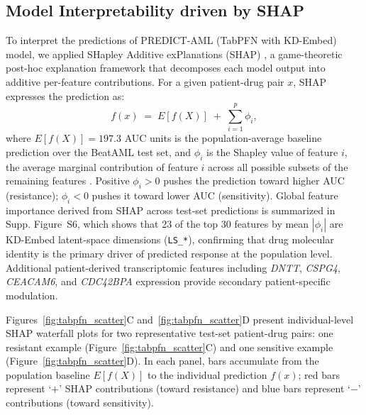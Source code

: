 \documentclass[pdflatex,sn-mathphys-num]{sn-jnl}
\theoremstyle{thmstyleone}
\theoremstyle{thmstyletwo}
\theoremstyle{thmstylethree}
\begin{document}
\subsection{Model Interpretability driven by SHAP}\label{sec3.3}
To interpret the predictions of PREDICT-AML (TabPFN with KD-Embed) model, we applied SHapley Additive exPlanations (SHAP) \cite{lundberg2017unified}, a game-theoretic post-hoc explanation framework that decomposes each model output into additive per-feature contributions. For a given patient-drug pair $x$, SHAP expresses the prediction as:
\begin{equation}
    f(x) \;=\; E[f(X)] \;+\; \sum_{i=1}^{p} \phi_i,
    \label{eq:shap}
\end{equation}
where $E[f(X)] = 197.3$ AUC units is the population-average baseline prediction over the BeatAML test set, and $\phi_i$ is the Shapley value of feature $i$, the average marginal contribution of feature $i$ across all possible subsets of the remaining features \cite{shapley1953stochastic}. Positive $\phi_i > 0$ pushes the prediction toward higher AUC (resistance); $\phi_i < 0$ pushes it toward lower AUC (sensitivity). Global feature importance derived from SHAP across test-set predictions is summarized in Supp. Figure~S6, which shows that 23 of the top 30 features by mean $|\phi_i|$ are KD-Embed latent-space dimensions (\texttt{LS\_*}), confirming that drug molecular identity is the primary driver of predicted response at the population level. Additional patient-derived transcriptomic features including \textit{DNTT}, \textit{CSPG4}, \textit{CEACAM6}, and \textit{CDC42BPA} expression provide secondary patient-specific modulation.

Figures~\ref{fig:tabpfn_scatter}C and~\ref{fig:tabpfn_scatter}D present individual-level SHAP waterfall plots for two representative test-set patient-drug pairs: one resistant example (Figure~\ref{fig:tabpfn_scatter}C) and one sensitive example (Figure~\ref{fig:tabpfn_scatter}D). In each panel, bars accumulate from the population baseline $E[f(X)]$ to the individual prediction $f(x)$; red bars represent `$+$' SHAP contributions (toward resistance) and blue bars represent `$-$' contributions (toward sensitivity).

\end{document}
